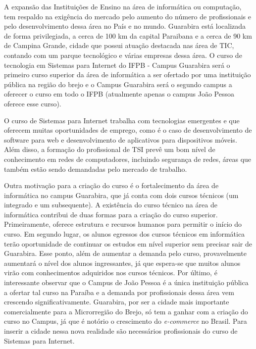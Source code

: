 A expansão das Instituições de Ensino na área de informática ou computação, tem respaldo na exigência do mercado pelo aumento do número de profissionais e pelo desenvolvimento dessa área no País e no mundo. Guarabira est\'a localizada de forma privilegiada, a cerca de 100 km da capital Paraibana e a cerca de 90 km de Campina Grande, cidade que possui atua\c{c}\~ao destacada nas \'area de TIC, contando com um parque tecnol\'ogico e v\'arias empresas dessa \'area. O curso de tecnologia em Sistemas para Internet do IFPB - Campus Guarabira ser\'a o primeiro curso superior da \'area de inform\'atica a ser ofertado por uma institui\c{c}\~ao p\'ublica na região do brejo e o Campus Guarabira ser\'a o segundo campus a oferecer o curso em todo o IFPB (atualmente apenas o campus Jo\~ao Pessoa oferece esse curso).

O curso de Sistemas para Internet trabalha com tecnologias emergentes e que oferecem muitas oportunidades de emprego, como é o caso de desenvolvimento de software para web e desenvolvimento de aplicativos para dispositivos móveis. Além disso, a formação do profissional de TSI prevê um bom nível de conhecimento em redes de computadores, incluindo segurança de redes, áreas que também estão sendo demandadas pelo mercado de trabalho.

Outra motiva\c{c}\~ao para a criação do curso é o fortalecimento da área de informática no campus Guarabira, que já conta com dois cursos técnicos (um integrado e um subsequente). A existência do curso técnico na área de informática contribui de duas formas para a criação do curso superior. Primeiramente, oferece estrutura e recursos humanos para permitir o início do curso. Em segundo lugar, os alunos egressos dos cursos técnicos em informática terão oportunidade de continuar os estudos em nível superior sem precisar sair de Guarabira. Esse ponto, além de aumentar a demanda pelo curso, provavelmente aumentará o nível dos alunos ingressantes, já que espera-se que muitos alunos virão com conhecimentos adquiridos nos cursos técnicos. Por último, é interessante observar que o Campus de João Pessoa é a única instituição pública a ofertar tal curso na Paraíba e a demanda por profissionais dessa área vem crescendo significativamente. Guarabira, por ser a cidade mais importante comercialmente para a Microrregião do Brejo, só tem a ganhar com a criação do curso no Campus, já que é notório o crescimento do \textit{e-commerce} no Brasil. Para inserir a cidade nessa nova realidade são necessários profissionais do curso de Sistemas para Internet. %

